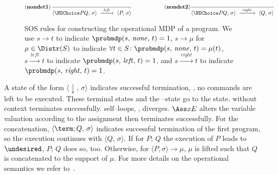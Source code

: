 \begin{figure}[t]
\begin{align*}
&(\textbf{nondet1})\,\frac{\vphantom{\langle}}{\langle \NDChoice P Q ,\, \sigma \rangle ~ \xrightarrow{~\mathit{left}~} ~ \langle P,\, \sigma \rangle}\qquad\qquad\qquad
(\textbf{nondet2})\frac{\vphantom{\langle}}{\langle \NDChoice P Q ,\, \sigma \rangle ~\xrightarrow{~\mathit{right}~}~ \langle Q,\, \sigma \rangle}
\end{align*}\normalsize
\caption{
SOS rules for constructing the operational MDP of a \cpGCL program.
We use $s \longrightarrow t$ to indicate $\probmdp(s,\, \mathit{none},\, t) = 1$, $s \longrightarrow \mu$ for $\mu \in \Distr(S)$ to indicate $\forall t \in S\colon \probmdp(s,\, \mathit{none},\, t) = \mu(t)$, $s \xrightarrow{~\mathit{left}~} t$ to indicate $\probmdp(s,\, \mathit{left},\, t) = 1$, and $s \xrightarrow{~\mathit{right}~} t$ to indicate $\probmdp(s,\, \mathit{right},\, t) = 1$.
}
\label{fig:sos-rules}
\end{figure}
A state of the form $\langle {\downarrow},\, \sigma \rangle$ indicates successful termination, \ie, no commands are left to be executed.
These terminal states and the \undesired--state go to the \sink state. 
\Skip without context terminates successfully.
\Abort self--loops, \ie, diverges. 
$\Ass x E$ alters the variable valuation according to the assignment then terminates successfully. 
For the concatenation, $\langle\term;{Q},\, \sigma \rangle$ indicates successful termination of the first program, so the execution continues with $\langle{Q},\, \sigma \rangle$.
If for $P;\,Q$ the execution of $P$ leads to $\undesired$, $P;\,Q$ does so, too.
Otherwise, for $\langle P,\sigma \rangle{\longrightarrow}\mu$, $\mu$ is lifted such that $Q$ is concatenated to the support of $\mu$. For more details on the operational semantics we refer to~\cite{DBLP:journals/pe/GretzKM14}.

